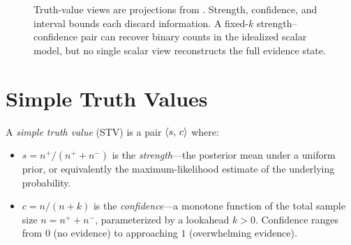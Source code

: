 \documentclass[11pt,openany]{report}
\begin{document}
\begin{figure}[htbp]
\centering
{}
\caption{Truth-value views are projections from \Evidence{}.
Strength, confidence, and interval bounds each discard information.
A fixed-$k$ strength--confidence pair can recover binary counts in the
idealized scalar model, but no single scalar view reconstructs the full
evidence state.}
\label{fig:tv-views-projections}
\end{figure}

\section{Simple Truth Values}

A \emph{simple truth value} (STV) is a pair $\langle s,\, c \rangle$ where:
\begin{itemize}
\item $s = n^+ / (n^+ + n^-)$ is the \emph{strength}---the posterior mean
  under a uniform prior, or equivalently the maximum-likelihood estimate
  of the underlying probability.
\item $c = n / (n + k)$ is the \emph{confidence}---a monotone function of
  the total sample size $n = n^+ + n^-$, parameterized by a lookahead
  $k > 0$.  Confidence ranges from $0$ (no evidence) to approaching $1$
  (overwhelming evidence).
\end{itemize}
\end{document}
